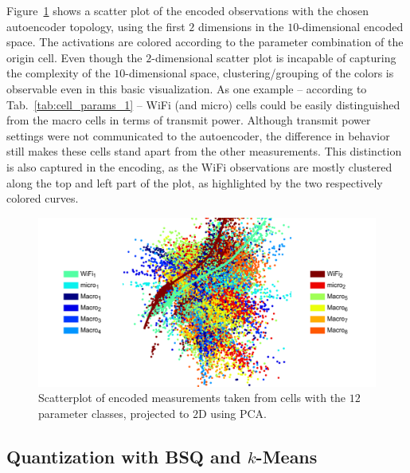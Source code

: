 			Figure~\ref{fig:ae_encoding} shows a scatter plot of the encoded observations with the chosen autoencoder topology, using the first $2$ dimensions in the $10$-dimensional encoded space.
			The activations are colored according to the parameter combination of the origin cell.
			Even though the $2$-dimensional scatter plot is incapable of capturing the complexity of the $10$-dimensional space, clustering/grouping of the colors is observable even in this basic visualization.
			As one example -- according to Tab.~\ref{tab:cell_params_1} -- WiFi (and micro) cells could be easily distinguished from the macro cells in terms of transmit power.
			Although transmit power settings were not communicated to the autoencoder, the difference in behavior still makes these cells stand apart from the other measurements.
			This distinction is also captured in the encoding, as the WiFi observations are mostly clustered along the top and left part of the plot, as highlighted by the two respectively colored curves.
		
			\begin{figure}[ht]
				\centering
				\includegraphics[width=\linewidth]{figures/04_ema/ae_encoding/ae_encoding.pdf}
				\caption[Scatterplot of the encoded measurements in the EMA evaluation]{Scatterplot of encoded measurements taken from cells with the $12$ parameter classes, projected to $2$D using PCA.}
				\label{fig:ae_encoding}
			\end{figure}
		
		\subsection{Quantization with BSQ and $k$-Means}
		
